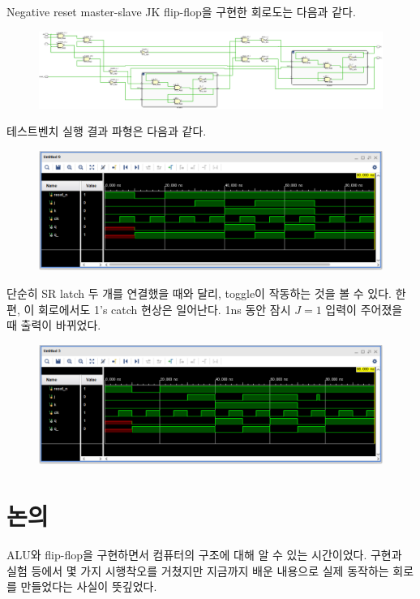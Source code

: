 \documentclass{scrartcl}
\begin{document}
Negative reset master-slave JK flip-flop을 구현한 회로도는 다음과 같다.
\begin{figure}[H]
  \centering
  \includegraphics[width=0.9\linewidth]{lab5_2_schematic-crop.pdf}
\end{figure}
테스트벤치 실행 결과 파형은 다음과 같다.
\begin{figure}[H]
  \centering
  \includegraphics[width=0.9\linewidth]{lab5_2_fixed_waveform.png}
\end{figure}
단순히 SR latch 두 개를 연결했을 때와 달리, toggle이 작동하는 것을 볼 수 있다.
한편, 이 회로에서도 1's catch 현상은 일어난다. 1ns 동안 잠시 \(J = 1\) 입력이 주어졌을 때 출력이 바뀌었다.
\begin{figure}[H]
  \centering
  \includegraphics[width=0.9\linewidth]{lab5_2_fixed_1catch_waveform.png}
\end{figure}

\section{논의}
ALU와 flip-flop을 구현하면서 컴퓨터의 구조에 대해 알 수 있는 시간이었다.
구현과 실험 등에서 몇 가지 시행착오를 거쳤지만 지금까지 배운 내용으로 실제 동작하는 회로를 만들었다는 사실이 뜻깊었다.
\end{document}
